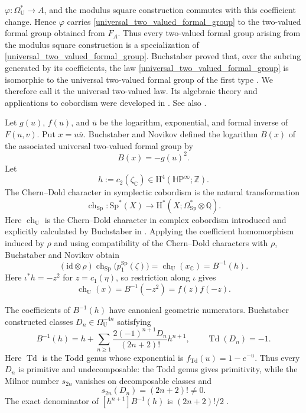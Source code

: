 \documentclass[14pt,dvipsnames]{extarticle}
\numberwithin{equation}{subsection}
\theoremstyle{plain}
\theoremstyle{definition}
\theoremstyle{definition}
\DeclareMathOperator{\Td}{Td}
\newcommand{\OmSp}{\Omega_{\mathrm{Sp}}^{\ast}}
\newcommand{\U}{\mathrm U}
\newcommand{\HP}{\mathbb{H}\mathrm P}
\newcommand{\Sp}{\mathrm{Sp}}
\newcommand{\Uu}{\mathrm{U}}
\begin{document}
$\varphi\colon\Omega_{\mathrm U}^{\ast}\to A$, and the modulus square
construction commutes with this coefficient change. Hence $\varphi$ carries
\eqref{universal_two_valued_formal_group} to the two-valued formal group
obtained from $F_A$. Thus every two-valued formal group arising from the
modulus square construction is a specialization of
\eqref{universal_two_valued_formal_group}. Buchstaber proved that, over the
subring generated by its coefficients, the law \eqref{universal_two_valued_formal_group} is isomorphic to the universal
two-valued formal group of the first type \cite[Theorems~2.3--2.4]{Buc78}.
We therefore call it the universal two-valued law. Its algebraic theory and
applications to cobordism were developed in \cite{Buc75,Buc76,Buc78}.
See also \cite{Buc06}.

Let \(g(u)\), \(f(u)\), and \(\bar u\) be the logarithm, exponential, and
formal inverse of \(F(u,v)\). Put
\(x=u\bar u\). Buchstaber and Novikov defined the logarithm \(B(x)\) of the
associated universal two-valued formal group by
\[
 B(x)=-g(u)^2.
\]
Let
\[
h:=c_2(\zeta_{\mathbb C})
 \in \mathrm H^4(\HP^\infty;\mathbb Z).
\]
The Chern--Dold character in symplectic cobordism is the natural
transformation \cite{Buc70}
\[
 \operatorname{ch}_{\Sp}\colon
 \Sp^*(X)\longrightarrow
 \mathrm H^*\!\left(X;\OmSp\otimes\mathbb Q\right).
\]
Here $\operatorname{ch}_{\U}$ is the Chern--Dold character in complex
cobordism introduced and explicitly calculated by Buchstaber in
\cite{Buc70}.
Applying the coefficient homomorphism induced by $\rho$ and using compatibility
of the Chern--Dold characters with $\rho$, Buchstaber and Novikov obtain
\cite[Lemma~2.16]{BN71}
\[
 (\mathrm{id}\otimes\rho)\operatorname{ch}_{\Sp}
 \bigl(p_1^{\Sp}(\zeta)\bigr)
 =\operatorname{ch}_{\U}(x_{\mathbb C})
 =B^{-1}(h).
\]
Here $\iota^*h=-z^2$ for $z=c_1(\eta)$, so restriction along $\iota$ gives
$$\operatorname{ch}_{\U}(x)=B^{-1}(-z^2)=f(z)f(-z).$$

The coefficients of \(B^{-1}(h)\) have canonical geometric numerators.
Buchstaber constructed classes \(D_n\in\Omega_{\Uu}^{-4n}\) satisfying
\begin{equation}\label{eq:intro-two-valued-exponential}
 B^{-1}(h)
 =h+\sum_{n\geq1}
 \frac{2(-1)^{n+1}D_n}{(2n+2)!}h^{n+1},
 \qquad
 \Td(D_n)=-1.
\end{equation}
Here \(\Td\) is the Todd genus whose exponential is
\(f_{\Td}(u)=1-e^{-u}\). Thus every \(D_n\) is primitive and undecomposable:
the Todd genus gives primitivity, while the Milnor number $s_{2n}$ vanishes on decomposable
classes and
\[
 s_{2n}(D_n)=(2n+2)!\ne0.
\]
The exact denominator of \([h^{n+1}]B^{-1}(h)\) is \((2n+2)!/2\)
\cite[Theorem~2.10]{Buc78}.
\end{document}
